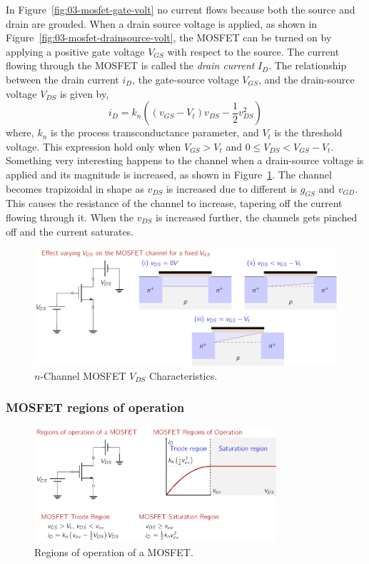 In Figure~\ref{fig:03-mosfet-gate-volt} no current flows because both the source and drain are grouded. When a drain source voltage is applied, as shown in Figure~\ref{fig:03-mosfet-drainsource-volt}, the MOSFET can be turned on by applying a positive gate voltage $V_{GS}$ with respect to the source. The current flowing through the MOSFET is called the \textit{drain current} $I_D$. The relationship between the drain current $i_D$, the gate-source voltage $V_{GS}$, and the drain-source voltage $V_{DS}$ is given by,
\begin{equation}
    i_D = k_n\left(\left(v_{GS} - V_t\right)v_{DS} - \frac{1}{2}v_{DS}^2\right)
    \label{eq03-mosfet-id-vgs}
\end{equation}
where, $k_n$ is the process transconductance parameter, and $V_t$ is the threshold voltage. This expression hold only when $V_{GS} > V_t$ and $0 \leq V_{DS} < V_{GS} - V_t$. Something very interesting happens to the channel when a drain-source voltage is applied and its magnitude is increased, as shown in Figure~\ref{fig:03-mosfet-vds-pinchoff}. The channel becomes trapizoidal in shape as $v_{DS}$ is increased due to different is $g_{GS}$ and $v_{GD}$. This causes the resistance of the channel to increase, tapering off the current flowing through it. When the $v_{DS}$ is increased further, the channels gets pinched off and the current saturates.
\begin{figure}[b]
    \centering
    \includegraphics[width=1\textwidth]{figures/ch03/fig03-mosfet-vds-pinchoff.pdf}
    \caption{$n$-Channel MOSFET $V_{DS}$ Characteristics.}
    \label{fig:03-mosfet-vds-pinchoff}
\end{figure}

\subsubsection{MOSFET regions of operation}

\begin{figure}[t]
    \centering
    \includegraphics[width=0.8\textwidth]{figures/ch03/fig03-mosfet-regions.pdf}
    \caption{Regions of operation of a MOSFET.}
    \label{fig:03-mosfet_regions}
\end{figure}

